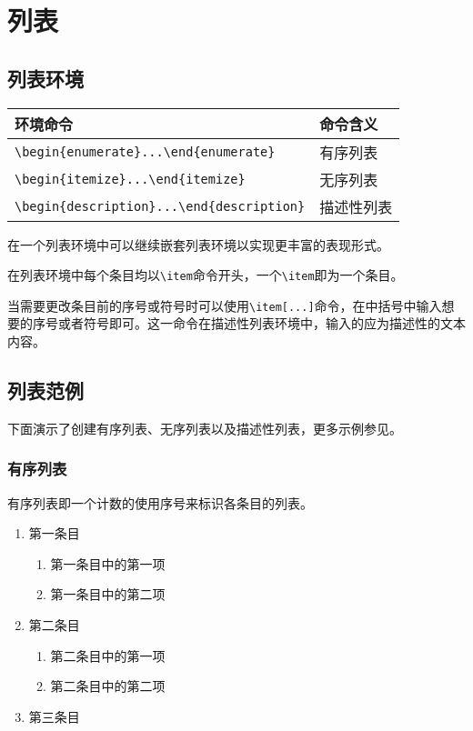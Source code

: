 \section{列表}

\subsection{列表环境}

\begin{tabular}{l l}
\toprule
环境命令 & 命令含义\\
\midrule
\verb|\begin{enumerate}...\end{enumerate}| & 有序列表 \\
\verb|\begin{itemize}...\end{itemize}| & 无序列表 \\
\verb|\begin{description}...\end{description}| & 描述性列表 \\
\bottomrule
\end{tabular}

在一个列表环境中可以继续嵌套列表环境以实现更丰富的表现形式。

在列表环境中每个条目均以\verb|\item|命令开头，一个\verb|\item|即为一个条目。

当需要更改条目前的序号或符号时可以使用\verb|\item[...]|命令，在中括号中输入想要的序号或者符号即可。这一命令在描述性列表环境中，输入的应为描述性的文本内容。

\subsection{列表范例}

下面演示了创建有序列表、无序列表以及描述性列表，更多示例参见。

\subsubsection{有序列表}

有序列表即一个计数的使用序号来标识各条目的列表。
  \begin{enumerate}
      \item 第一条目
          \begin{enumerate}
              \item 第一条目中的第一项
              \item 第一条目中的第二项
          \end{enumerate}
      \item 第二条目
    \begin{enumerate}[label=(\roman*)]
      \item 第二条目中的第一项
      \item 第二条目中的第二项
    \end{enumerate}
      \item 第三条目
  \end{enumerate}

